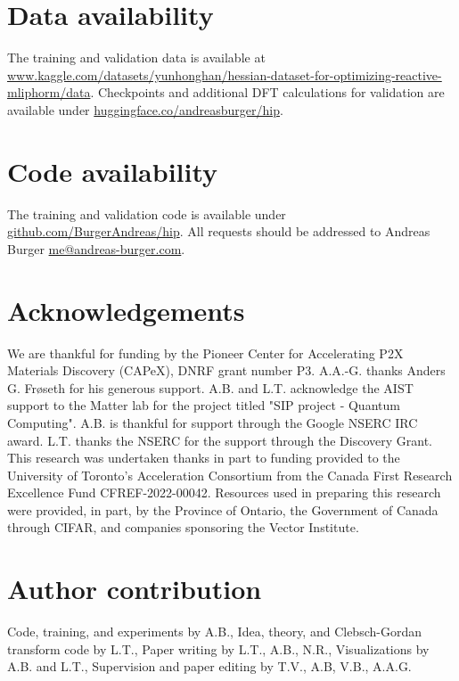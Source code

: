 \documentclass[pdflatex,sn-mathphys-num]{sn-jnl}%
\theoremstyle{thmstyleone}%
\theoremstyle{thmstyletwo}%
\theoremstyle{thmstylethree}%
\begin{document}
\backmatter




\section{Data availability}
The training and validation data is available at \url{www.kaggle.com/datasets/yunhonghan/hessian-dataset-for-optimizing-reactive-mliphorm/data}. Checkpoints and additional DFT calculations for validation are available under \url{huggingface.co/andreasburger/hip}.

\section{Code availability}
The training and validation code is available under \url{github.com/BurgerAndreas/hip}.
All requests should be addressed to Andreas Burger \url{me@andreas-burger.com}.


\section{Acknowledgements}
We are thankful for funding by the Pioneer Center for Accelerating P2X Materials Discovery (CAPeX), DNRF grant number P3.
A.A.-G. thanks Anders G. Frøseth for his generous support.
A.B. and L.T. acknowledge the AIST support to the Matter lab for the project titled "SIP project - Quantum Computing".
A.B. is thankful for support through the Google NSERC IRC award.
L.T. thanks the NSERC for the support through the Discovery Grant.
This research was undertaken thanks in part to funding provided to the University of Toronto’s Acceleration Consortium from the Canada First Research Excellence Fund CFREF-2022-00042.
Resources used in preparing this research were provided, in part, by the Province of Ontario, the Government of Canada through CIFAR, and companies sponsoring the Vector Institute.


\section{Author contribution}
Code, training, and experiments by A.B., Idea, theory, and Clebsch-Gordan transform code by L.T., Paper writing by L.T., A.B., N.R., Visualizations by A.B. and L.T., Supervision and paper editing by T.V., A.B, V.B., A.A.G.
\end{document}

